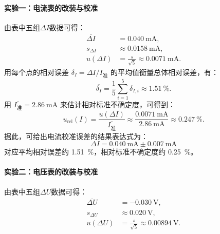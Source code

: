 \documentclass[]{../template/Report}%
\begin{document}
\begin{fullreportonly}
    \paragraph{实验一：电流表的改装与校准}
    由表中五组$\Delta I$数据可得：
    \begin{align}
        \overline{\Delta I} & = \SI{0.040}{\milli\ampere},                             \\
        s_{\Delta I}        & \approx \SI{0.0158}{\milli\ampere},                      \\
        u(\Delta I)         & = \frac{s}{\sqrt{5}} \approx \SI{0.0071}{\milli\ampere}.
    \end{align}
    用每个点的相对误差 $\delta_I=\Delta I/I_\text{准}$ 的平均值衡量总体相对误差，有：
    \begin{equation}
        \overline{\delta_I} = \frac{1}{5}\sum_{i=1}^5 \delta_{I,i} \approx \SI{1.51}{\percent}.
    \end{equation}
    用 $\overline{I_\text{准}}=\SI{2.86}{\milli\ampere}$ 来估计相对标准不确定度，可得到：
    \begin{equation}
        u_\text{rel}(I) = \frac{u(\Delta I)}{\overline{I_\text{准}}} \approx \frac{\SI{0.0071}{\milli\ampere}}{\SI{2.86}{\milli\ampere}} \approx \SI{0.247}{\percent}.
    \end{equation}
    据此，可给出电流校准误差的结果表达式为：
    \begin{equation}
        \boxed{\Delta I = \SI{0.040}{\milli\ampere} \pm \SI{0.007}{\milli\ampere}}
    \end{equation}
    对应平均相对误差约 \SI{1.51}{\percent}，相对标准不确定度约 \SI{0.25}{\percent}。

    \paragraph{实验二：电压表的改装与校准}
    由表中五组$\Delta U$数据可得：
    \begin{align}
        \overline{\Delta U} & = \SI{-0.030}{\volt},                             \\
        s_{\Delta U}        & \approx \SI{0.020}{\volt},                        \\
        u(\Delta U)         & = \frac{s}{\sqrt{5}} \approx \SI{0.00894}{\volt}.
    \end{align}


\end{fullreportonly}
\end{document}
